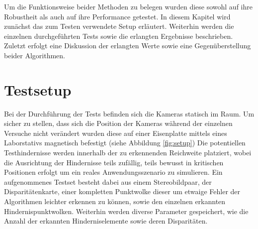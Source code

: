 Um die Funktionsweise beider Methoden zu belegen wurden diese sowohl auf ihre Robustheit als auch auf ihre Performance getestet. In diesem Kapitel wird zunächst das zum Testen verwendete Setup erläutert. Weiterhin werden die einzelnen durchgeführten Tests sowie die erlangten Ergebnisse beschrieben. Zuletzt erfolgt eine Diskussion der erlangten Werte sowie eine Gegenüberstellung beider Algorithmen.

\section{Testsetup}
\label{sec:test_setup}

Bei der Durchführung der Tests befinden sich die Kameras statisch im Raum. Um sicher zu stellen, dass sich die Position der Kameras während der einzelnen Versuche nicht verändert wurden diese auf einer Eisenplatte mittels eines Laborstativs magnetisch befestigt (siehe Abbildung \ref{fig:setup}) Die potentiellen Testhindernisse werden innerhalb der zu erkennenden Reichweite platziert, wobei die Ausrichtung der Hindernisse teils zufällig, teils bewusst in kritischen Positionen erfolgt um ein reales Anwendungsszenario zu simulieren. Ein aufgenommenes Testset besteht dabei aus einem Stereobildpaar, der Disparitätenkarte, einer kompletten Punktwolke dieser um etwaige Fehler der Algorithmen leichter erkennen zu können, sowie den einzelnen erkannten Hindernispunktwolken. Weiterhin werden diverse Parameter gespeichert, wie die Anzahl der erkannten Hinderniselemente sowie deren Disparitäten.\\

